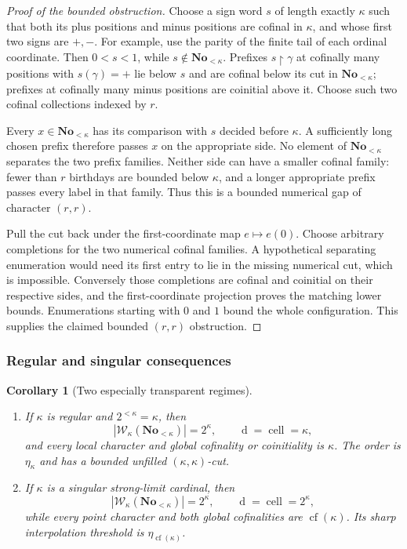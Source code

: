 \documentclass[11pt]{article}
\newtheorem{corollary}[corollary]{Corollary}
\theoremstyle{definition}
\theoremstyle{remark}
\newcommand{\No}{\mathbf{No}}
\newcommand{\WO}{\mathcal W}
\newcommand{\dens}{\operatorname{d}}
\newcommand{\cell}{\operatorname{cell}}
\begin{document}
\begin{proof}[Proof of the bounded obstruction]
Choose a sign word $s$ of length exactly $\kappa$ such that both its
plus positions and minus positions are cofinal in $\kappa$, and whose
first two signs are $+,-$.  For example, use the parity of the finite
tail of each ordinal coordinate.  Then $0<s<1$, while
$s\notin \No_{<\kappa}$.  Prefixes $s\restriction\gamma$ at cofinally many
positions with $s(\gamma)=+$ lie below $s$ and are cofinal below its
cut in $\No_{<\kappa}$; prefixes at cofinally many minus positions are
coinitial above it.  Choose such two cofinal collections indexed by
$r$.

Every $x\in \No_{<\kappa}$ has its comparison with $s$ decided before
$\kappa$.  A sufficiently long chosen prefix therefore passes $x$ on
the appropriate side.  No element of $\No_{<\kappa}$ separates the two
prefix families.  Neither side can have a smaller cofinal family:
fewer than $r$ birthdays are bounded below $\kappa$, and a longer
appropriate prefix passes every label in that family.  Thus this is
a bounded numerical gap of character $(r,r)$.

Pull the cut back under the first-coordinate map
$e\mapsto e(0)$.  Choose arbitrary completions for the two numerical
cofinal families.  A hypothetical separating enumeration would need
its first entry to lie in the missing numerical cut, which is
impossible.  Conversely those completions are cofinal and coinitial
on their respective sides, and the first-coordinate projection
proves the matching lower bounds.  Enumerations starting with $0$ and
$1$ bound the whole configuration.  This supplies the claimed
bounded $(r,r)$ obstruction.
\end{proof}

\subsubsection{Regular and singular consequences}

\begin{corollary}[Two especially transparent regimes]
\label{swo:sh:cor:new-regular-singular-invariants}
\begin{enumerate}
\item If $\kappa$ is regular and $2^{<\kappa}=\kappa$, then
\[
 |\WO_\kappa(\No_{<\kappa})|=2^\kappa,\qquad
 \dens=\cell=\kappa,
\]
and every local character and global cofinality or coinitiality is
$\kappa$.  The order is $\eta_\kappa$ and has a bounded unfilled
$(\kappa,\kappa)$-cut.
\item If $\kappa$ is a singular strong-limit cardinal, then
\[
 |\WO_\kappa(\No_{<\kappa})|=2^\kappa,\qquad
 \dens=\cell=2^\kappa,
\]
while every point character and both global cofinalities are
$\operatorname{cf}(\kappa)$.  Its sharp interpolation threshold is
$\eta_{\operatorname{cf}(\kappa)}$.
\end{enumerate}
\end{corollary}
\end{document}
